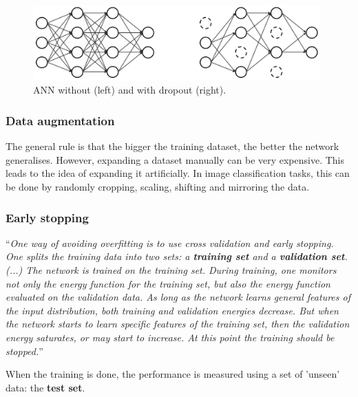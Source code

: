 \vspace{4mm}
\begin{figure}[htb]
	\begin{center}
		\includegraphics*[width=11cm, keepaspectratio]{obr/dropou.png}
	\end{center}
	\vspace{4mm}
	\caption{ANN without (left) and with dropout (right). \cite{arvi}} 
	\label{dropout}
\end{figure}

\subsubsection{Data augmentation}

The general rule is that the bigger the training dataset, the better the network generalises. However, expanding a dataset manually can be very expensive. This leads to the idea of expanding it artificially. In image classification tasks, this can be done by randomly cropping, scaling, shifting and mirroring the data. \cite{mehlig}

\subsubsection{Early stopping}

\enquote{\textit{One way of avoiding overfitting is to use cross validation and early stopping. One splits the training data into two sets: a \textbf{training set} and a \textbf{validation set}. (...) The network is trained on the training set. During training, one monitors not only the energy function for the training set, but also the energy function evaluated on the validation data. As long as the network learns general features of the input distribution, both training and validation energies decrease. But when the network starts to learn specific features of the training set, then the validation energy saturates, or may start to increase. At this point the training should be stopped.}} \cite{mehlig}

When the training is done, the performance is measured using a set of 'unseen' data: the \textbf{test set}. \cite{mehlig}

